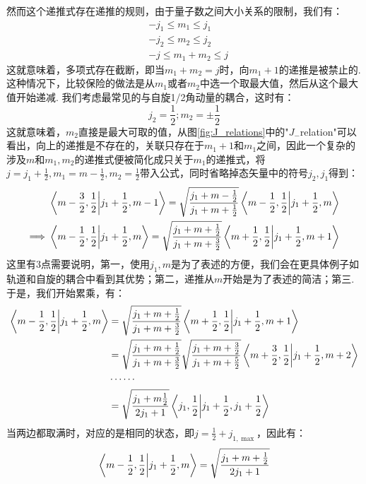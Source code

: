 然而这个递推式存在递推的规则，由于量子数之间大小关系的限制，我们有：
\begin{align*}
& -j_{1}\leq m_{1}\leq j_{1} \\
& -j_{2}\leq m_{2}\leq j_{2} \\
& -j \leq m_{1} + m_{2} \leq j
\end{align*}
这就意味着，多项式存在截断，即当\(m_{1}+m_{2}=j\)时，向\(m_{1}+1\)的递推是被禁止的. 这种情况下，比较保险的做法是从\(m_{1}\)或者\(m_{2}\)中选一个取最大值，然后从这个最大值开始递减. 我们考虑最常见的与自旋1/2角动量的耦合，这时有：
\[
j_{2} = \frac{1}{2}; m_{2} = \pm\frac{1}{2}
\]
这就意味着，\(m_{2}\)直接是最大可取的值，从图\ref{fig:J_relations}中的"\(J_{-}\)relation"可以看出，向上的递推是不存在的，关联只存在于\(m_{1}+1\)和\(m_{1}\)之间，因此一个复杂的涉及\(m\)和\(m_{1},m_{2}\)的递推式便被简化成只关于\(m_{1}\)的递推式，将\(j=j_{1}+\frac{1}{2},m_{1} = m-\frac{1}{2},m_{2}=\frac{1}{2}\)带入公式，同时省略掉态矢量中的符号\(j_{2},j_{1}\)得到：
\begin{align*}
& \bra{m-\frac{3}{2},\frac{1}{2}}\ket{j_{1}+\frac{1}{2},m-1} = \sqrt{\frac{j_{1} + m -\frac{1}{2}}{j_{1} + m + \frac{1}{2}}}\bra{m-\frac{1}{2},\frac{1}{2}}\ket{j_{1}+\frac{1}{2},m} \\
\Longrightarrow\ 
& \bra{m-\frac{1}{2},\frac{1}{2}}\ket{j_{1}+\frac{1}{2},m} = \sqrt{\frac{j_{1} + m +\frac{1}{2}}{j_{1} + m + \frac{3}{2}}}\bra{m+\frac{1}{2},\frac{1}{2}}\ket{j_{1}+\frac{1}{2},m+1} \\
\end{align*}
这里有3点需要说明，第一，使用\(j_{1},m\)是为了表述的方便，我们会在更具体例子如轨道和自旋的耦合中看到其优势；第二，递推从\(m\)开始是为了表述的简洁；第三. 于是，我们开始累乘，有：
\begin{align*}
\bra{m-\frac{1}{2},\frac{1}{2}}\ket{j_{1}+\frac{1}{2},m} 
& = \sqrt{\frac{j_{1} + m +\frac{1}{2}}{j_{1} + m + \frac{3}{2}}}\bra{m+\frac{1}{2},\frac{1}{2}}\ket{j_{1}+\frac{1}{2},m+1} \\
& = \sqrt{\frac{j_{1} + m +\frac{1}{2}}{j_{1} + m + \frac{3}{2}}}\sqrt{\frac{j_{1} + m + \frac{3}{2}}{j_{1} + m + \frac{5}{2}}}\bra{m+\frac{3}{2},\frac{1}{2}}\ket{j_{1}+\frac{1}{2},m+2} \\
& \cdots\cdots \\
& = \sqrt{\frac{j_{1}+m\frac{1}{2}}{2j_{1}+1}}\bra{j_{1},\frac{1}{2}}\ket{j_{1}+\frac{1}{2},j_{1}+\frac{1}{2}}
\end{align*}
当两边都取满时，对应的是相同的状态，即\(j = \frac{1}{2} + j_{1,\max}\)，因此有：
\[
\bra{m-\frac{1}{2},\frac{1}{2}}\ket{j_{1}+\frac{1}{2},m}  = \sqrt{\frac{j_{1}+m+\frac{1}{2}}{2j_{1}+1}}
\]
